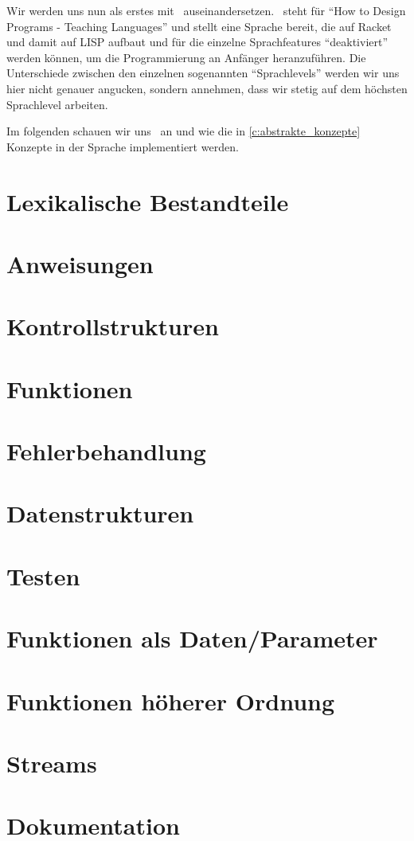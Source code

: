 Wir werden uns nun als erstes mit \racket\, auseinandersetzen. \racket\, steht für \enquote{How to Design Programs - Teaching Languages} und stellt eine Sprache bereit, die auf Racket und damit auf LISP aufbaut und für die einzelne Sprachfeatures \enquote{deaktiviert} werden können, um die Programmierung an Anfänger heranzuführen. Die Unterschiede zwischen den einzelnen sogenannten \enquote{Sprachlevels} werden wir uns hier nicht genauer angucken, sondern annehmen, dass wir stetig auf dem höchsten Sprachlevel arbeiten.

Im folgenden schauen wir uns \racket\, an und wie die in \ref{c:abstrakte_konzepte} Konzepte in der Sprache implementiert werden.

\section{Lexikalische Bestandteile}
	

\section{Anweisungen}
	

\section{Kontrollstrukturen}
	

\section{Funktionen}
	

\section{Fehlerbehandlung}
	

\section{Datenstrukturen}
	

\section{Testen}
	

\section{Funktionen als Daten/Parameter}
	

\section{Funktionen höherer Ordnung}
	

\section{Streams} 
	

\section{Dokumentation}
	
